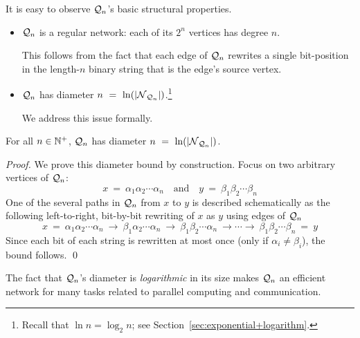 \medskip

\noindent
It is easy to observe $\mbox{$\cal Q$}_n$'s basic structural properties.
\begin{itemize}
\item {}
$\mbox{$\cal Q$}_n$ is a regular network: each of its $2^n$ vertices has degree $n$.

This follows from the fact that each edge of $\mbox{$\cal Q$}_n$ rewrites a single
bit-position in the length-$n$ binary string that is the edge's source
vertex.

\item {}
$\mbox{$\cal Q$}_n$ has diameter $n \ = \ \ln(|\mbox{$\cal N$}_{\mbox{{\scriptsize $\cal Q$}}_n}|)$.\footnote{Recall that
  $\ln n = \log_2 n$; see Section~\ref{sec:exponential+logarithm}.}

We address this issue formally.
\end{itemize}

\begin{prop}
\label{thm:hypercube-diameter}
For all $n \in \mathbb{N}^+$, $\mbox{$\cal Q$}_n$ has diameter $n \ = \ \ln(|\mbox{$\cal N$}_{\mbox{{\scriptsize $\cal Q$}}_n}|)$.
\end{prop}

\begin{proof}
We prove this diameter bound by construction.  Focus on two arbitrary
vertices of $\mbox{$\cal Q$}_n$:
\[ x \ = \ \alpha_1 \alpha_2 \cdots \alpha_n \ \ \ \mbox{ and } \ \ \
y \ = \ \beta_1 \beta_2 \cdots \beta_n
\]
One of the several paths in $\mbox{$\cal Q$}_n$ from $x$ to $y$ is described
schematically as the following left-to-right, bit-by-bit rewriting of
$x$ as $y$ using edges of $\mbox{$\cal Q$}_n$
\[
x \ = \ \alpha_1 \alpha_2 \cdots \alpha_n \ \rightarrow \
\beta_1 \alpha_2 \cdots \alpha_n \ \rightarrow \
\beta_1 \beta_2\cdots \alpha_n \ \rightarrow \cdots \rightarrow\ 
\beta_1 \beta_2 \cdots \beta_n \ = \ y
\]
Since each bit of each string is rewritten at most once (only if $\alpha_i \neq \beta_i$), the bound follows.
\qed
\end{proof}

\medskip

The fact that $\mbox{$\cal Q$}_n$'s diameter is {\em logarithmic} in its size makes
$\mbox{$\cal Q$}_n$ an efficient network for many tasks related to parallel
computing and communication.
\bigskip

